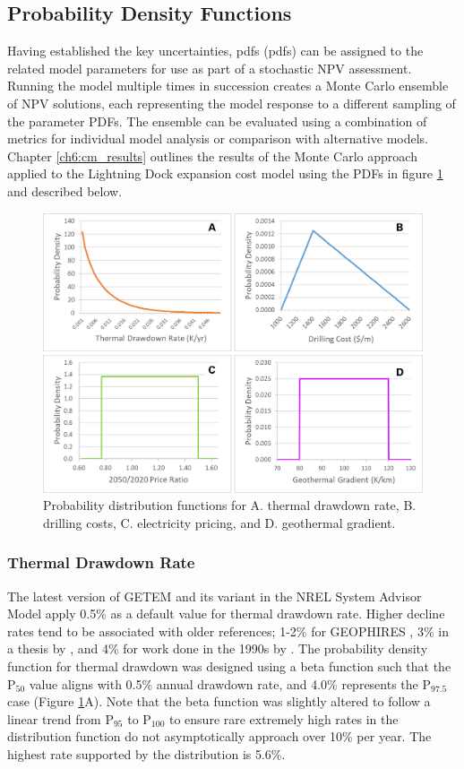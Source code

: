 \subsection{Probability Density Functions}\label{ch4:pdfs}
Having established the key uncertainties, \acrlong{pdf}s (\acrshort{pdf}s) can be assigned to the related model parameters for use as part of a stochastic NPV assessment. Running the model multiple times in succession creates a Monte Carlo ensemble of NPV solutions, each representing the model response to a different sampling of the parameter PDFs. The ensemble can be evaluated using a combination of metrics for individual model analysis or comparison with alternative models. Chapter \ref{ch6:cm_results} outlines the results of the Monte Carlo approach applied to the Lightning Dock expansion cost model using the PDFs in figure \ref{fig:cm_probdists} and described below.

\begin{figure}%
\centering
\includegraphics[width=.85\textwidth]{templates/images/Figure-ProbDists.png}
\singlespacing
\caption[Cost model probability distributions]{Probability distribution functions for A. thermal drawdown rate, B. drilling costs, C. electricity pricing, and D. geothermal gradient.}
\label{fig:cm_probdists}
\end{figure}

\subsubsection{Thermal Drawdown Rate}\label{cm4:prob_tdr}
The latest version of GETEM \citep{mines_getem_2016} and its variant in the NREL System Advisor Model \citep{blair_system_2018} apply 0.5\% as a default value for thermal drawdown rate. Higher decline rates tend to be associated with older references; 1-2\% for GEOPHIRES \citep{beckers_low-temperature_2016}, 3\% in a thesis by \citet{augustine_hydrothermal_2009}, and 4\% for work done in the 1990s by \citet{tester_economic_1990}. The probability density function for thermal drawdown was designed using a beta function such that the P$_{50}$ value aligns with 0.5\% annual drawdown rate, and 4.0\% represents the P$_{97.5}$ case (Figure \ref{fig:cm_probdists}A). Note that the beta function was slightly altered to follow a linear trend from P$_{95}$ to P$_{100}$ to ensure rare extremely high rates in the distribution function do not asymptotically approach over 10\% per year. The highest rate supported by the distribution is 5.6\%.

